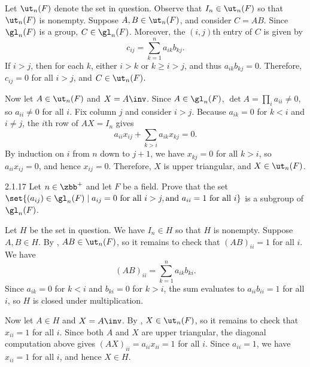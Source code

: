 \begin{sol}
    Let $\ut_n(F)$ denote the set in question.
	Observe that $I_n \in \ut_n(F)$ so that $\ut_n(F)$ is nonempty.
	Suppose $A, B \in \ut_n(F)$, and consider $C = AB$.
    Since $\gl_n(F)$ is a group, $C \in \gl_n(F)$.
	Moreover, the $(i, j)$th entry of $C$ is given by
    \[
    	c_{ij} = \sum_{k = 1}^n a_{ik}b_{kj}.
    \]
    If $i > j$, then for each $k$, either $i > k$ or $k \geq i > j$, and thus $a_{ik}b_{kj} = 0$.
    Therefore, $c_{ij} = 0$ for all $i > j$, and $C \in \ut_n(F)$.

    Now let $A \in \ut_n(F)$ and $X = A\inv$.
    Since $A \in \gl_n(F)$, $\det A = \prod_i a_{ii} \neq 0$, so $a_{ii} \neq 0$ for all $i$.
    Fix column $j$ and consider $i > j$.
    Because $a_{ik} = 0$ for $k < i$ and $i \neq j$, the $i$th row of $AX = I_n$ gives
    \[
        a_{ii}x_{ij} + \sum_{k > i} a_{ik}x_{kj} = 0.
    \]
    By induction on $i$ from $n$ down to $j+1$, we have $x_{kj} = 0$ for all $k > i$, so $a_{ii}x_{ij} = 0$, and hence $x_{ij} = 0$.
    Therefore, $X$ is upper triangular, and $X \in \ut_n(F)$.
\end{sol}

\begin{exercise}{2.1.17}
    Let $n \in \zbb^+$ and let $F$ be a field.
	Prove that the set $\set{(a_{ij}) \in \gl_n(F) \mid a_{ij} = 0 \text{ for all } i > j, \text{and } a_{ii} = 1 \text{ for all } i}$ is a subgroup of $\gl_n(F)$.
\end{exercise}

\begin{sol}
    Let $H$ be the set in question.
    We have $I_n \in H$ so that $H$ is nonempty.
	Suppose $A, B \in H$.
	By , $AB \in \ut_n(F)$, so it remains to check that $(AB)_{ii} = 1$ for all $i$.
	We have
    \[
    	(AB)_{ii} = \sum_{k = 1}^n a_{ik}b_{ki}.
    \]
    Since $a_{ik} = 0$ for $k < i$ and $b_{ki} = 0$ for $k > i$, the sum evaluates to $a_{ii}b_{ii} = 1$ for all $i$, so $H$ is closed under multiplication.
	
    Now let $A \in H$ and $X = A\inv$.
    By , $X \in \ut_n(F)$, so it remains to check that $x_{ii} = 1$ for all $i$.
    Since both $A$ and $X$ are upper triangular, the diagonal computation above gives $(AX)_{ii} = a_{ii}x_{ii} = 1$ for all $i$.
    Since $a_{ii} = 1$, we have $x_{ii} = 1$ for all $i$, and hence $X \in H$.
\end{sol}